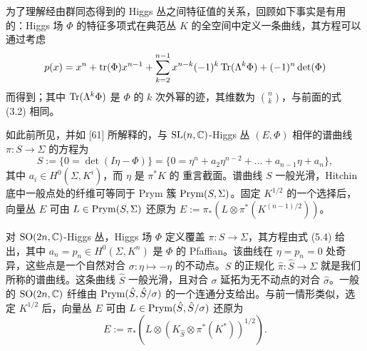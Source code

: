 
为了理解经由群同态得到的 Higgs 丛之间特征值的关系，回顾如下事实是有用的：Higgs 场 $\Phi$ 的特征多项式在典范丛 $K$ 的全空间中定义一条曲线，其方程可以通过考虑
\[
p(x)=x^n+\operatorname{tr}(\Phi)x^{n-1}+\sum_{k=2}^{n-1}x^{n-k}(-1)^k\operatorname{Tr}(\Lambda^k\Phi)+(-1)^n\det(\Phi)
\]
而得到；其中 $\operatorname{Tr}(\Lambda^k\Phi)$ 是 $\Phi$ 的 $k$ 次外幂的迹，其维数为 $\binom{n}{k}$，与前面的式 (3.2) 相同。


如此前所见，并如 [61] 所解释的，与 $\mathrm{SL}(n,\mathbb{C})$-Higgs 丛 $(E,\Phi)$ 相伴的谱曲线 $\pi : S\to\Sigma$ 的方程为
\begin{equation}
S := \{0=\det(I\eta-\Phi)\}=\{0=\eta^n+a_2\eta^{n-2}+\dots+a_{n-1}\eta+a_n\}, \tag{5.4}
\end{equation}
其中 $a_i\in H^0(\Sigma,K^i)$，而 $\eta$ 是 $\pi^*K$ 的 重言截面。谱曲线 $S$ 一般光滑，Hitchin 底中一般点处的纤维可等同于 Prym 簇 $\operatorname{Prym}(S,\Sigma)$。固定 $K^{1/2}$ 的一个选择后，向量丛 $E$ 可由 $L\in\operatorname{Prym}(S,\Sigma)$ 还原为 $E := \pi_*(L\otimes\pi^*(K^{(n-1)/2}))$。

对 $\mathrm{SO}(2n,\mathbb{C})$-Higgs 丛，Higgs 场 $\Phi$ 定义覆盖 $\pi : S\to\Sigma$，其方程由式 (5.4) 给出，其中 $a_n = p_n\in H^0(\Sigma,K^n)$ 是 $\Phi$ 的 Pfaffian。该曲线在 $\eta = p_n = 0$ 处奇异，这些点是一个自然对合 $\sigma : \eta\mapsto-\eta$ 的不动点。$S$ 的正规化 $\hat\pi : \hat S\to\Sigma$ 就是我们所称的谱曲线。这条曲线 $\hat S$ 一般光滑，且对合 $\sigma$ 延拓为无不动点的对合 $\hat\sigma$。一般的 $\mathrm{SO}(2n,\mathbb{C})$ 纤维由 $\operatorname{Prym}(\hat S,\hat S/\sigma)$ 的一个连通分支给出。与前一情形类似，选定 $K^{1/2}$ 后，向量丛 $E$ 可由 $L\in\operatorname{Prym}(\hat S,\hat S/\sigma)$ 还原为
\[
E := \pi_*(L\otimes(K_{\hat S}\otimes\pi^*(K^*))^{1/2}).
\]


